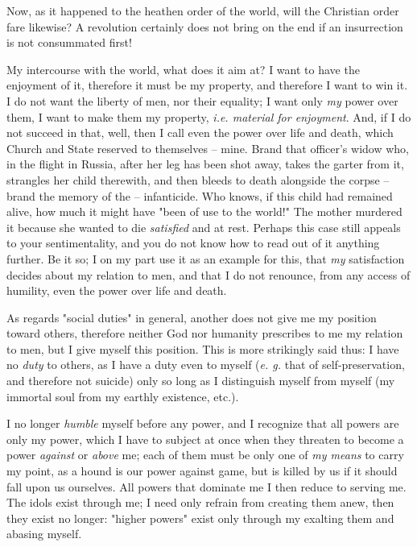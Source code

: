 Now, as it happened to the heathen order of the world, will the Christian 
order fare likewise? A revolution certainly does not bring on the end if an 
insurrection is not consummated first!

My intercourse with the world, what does it aim at? I want to have the 
enjoyment of it, therefore it must be my property, and therefore I want to win 
it. I do not want the liberty of men, nor their equality; I want only 
\textit{my} power over them, I want to make them my property, \textit{i.e. 
material for enjoyment}. And, if I do not succeed in that, well, then I call 
even the power over life and death, which Church and State reserved to 
themselves -- mine. Brand that officer's widow who, in the flight in Russia, 
after her leg has been shot away, takes the garter from it, strangles her 
child therewith, and then bleeds to death alongside the corpse -- brand the 
memory of the -- infanticide. Who knows, if this child had remained alive, how 
much it might have "{}been of use to the world!"{} The mother murdered it 
because she wanted to die \textit{satisfied} and at rest. Perhaps this case 
still appeals to your sentimentality, and you do not know how to read out of 
it anything further. Be it so; I on my part use it as an example for this, 
that \textit{my} satisfaction decides about my relation to men, and that I do 
not renounce, from any access of humility, even the power over life and death.

As regards "{}social duties"{} in general, another does not give me my 
position toward others, therefore neither God nor humanity prescribes to me my 
relation to men, but I give myself this position. This is more strikingly said 
thus: I have no \textit{duty} to others, as I have a duty even to myself 
(\textit{e. g.} that of self-preservation, and therefore not suicide) only so 
long as I distinguish myself from myself (my immortal soul from my earthly 
existence, etc.).

I no longer \textit{humble} myself before any power, and I recognize that all 
powers are only my power, which I have to subject at once when they threaten 
to become a power \textit{against} or \textit{above} me; each of them must be 
only one of \textit{my means} to carry my point, as a hound is our power 
against game, but is killed by us if it should fall upon us ourselves. All 
powers that dominate me I then reduce to serving me. The idols exist through 
me; I need only refrain from creating them anew, then they exist no longer: 
"{}higher powers"{} exist only through my exalting them and abasing myself.

